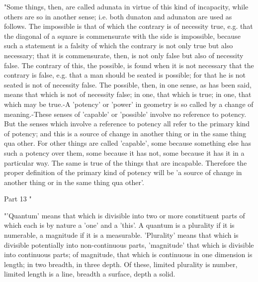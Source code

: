 "Some things, then, are called adunata in virtue of this kind of incapacity,
while others are so in another sense; i.e. both dunaton and adunaton
are used as follows. The impossible is that of which the contrary
is of necessity true, e.g. that the diagonal of a square is commensurate
with the side is impossible, because such a statement is a falsity
of which the contrary is not only true but also necessary; that it
is commensurate, then, is not only false but also of necessity false.
The contrary of this, the possible, is found when it is not necessary
that the contrary is false, e.g. that a man should be seated is possible;
for that he is not seated is not of necessity false. The possible,
then, in one sense, as has been said, means that which is not of necessity
false; in one, that which is true; in one, that which may be true.-A
'potency' or 'power' in geometry is so called by a change of meaning.-These
senses of 'capable' or 'possible' involve no reference to potency.
But the senses which involve a reference to potency all refer to the
primary kind of potency; and this is a source of change in another
thing or in the same thing qua other. For other things are called
'capable', some because something else has such a potency over them,
some because it has not, some because it has it in a particular way.
The same is true of the things that are incapable. Therefore the proper
definition of the primary kind of potency will be 'a source of change
in another thing or in the same thing qua other'. 

Part 13 "

"'Quantum' means that which is divisible into two or more constituent
parts of which each is by nature a 'one' and a 'this'. A quantum is
a plurality if it is numerable, a magnitude if it is a measurable.
'Plurality' means that which is divisible potentially into non-continuous
parts, 'magnitude' that which is divisible into continuous parts;
of magnitude, that which is continuous in one dimension is length;
in two breadth, in three depth. Of these, limited plurality is number,
limited length is a line, breadth a surface, depth a solid.

